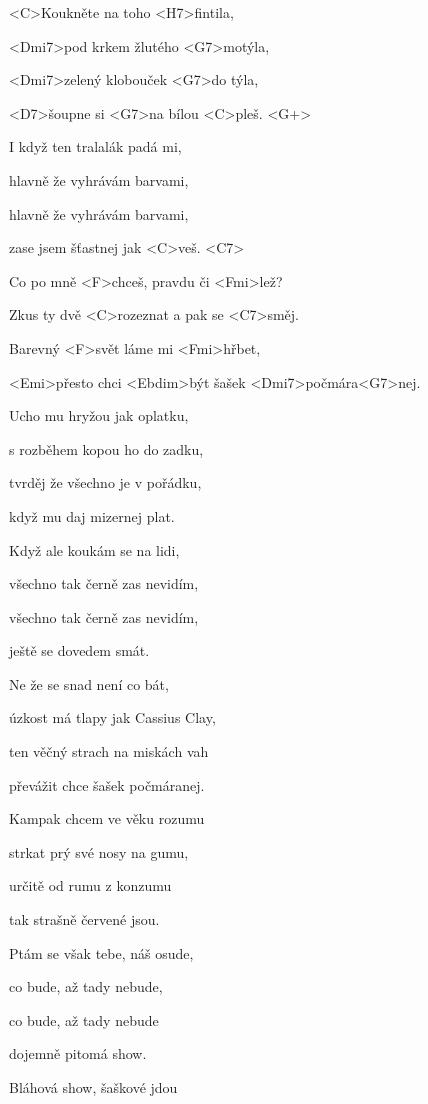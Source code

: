

\zs
<C>Koukněte na toho <H7>fintila,

<Dmi7>pod krkem žlutého <G7>motýla,

<Dmi7>zelený klobouček <G7>do týla,

<D7>šoupne si <G7>na bílou <C>pleš. <G+>
\ks

\zs
I když ten tralalák padá mi,

hlavně že vyhrávám barvami,

hlavně že vyhrávám barvami,

zase jsem šťastnej jak <C>veš. <C7>
\ks

\zr
Co po mně <F>chceš, pravdu či <Fmi>lež?

Zkus ty dvě <C>rozeznat a pak se <C7>směj.

Barevný <F>svět láme mi <Fmi>hřbet,

<Emi>přesto chci <Ebdim>být šašek <Dmi7>počmára<G7>nej.
\kr

\zs
Ucho mu hryžou jak oplatku,

s rozběhem kopou ho do zadku,

tvrděj že všechno je v pořádku,

když mu daj mizernej plat.
\ks

\zs
Když ale koukám se na lidi,

všechno tak černě zas nevidím,

všechno tak černě zas nevidím,

ještě se dovedem smát.
\ks

\zr
Ne že se snad není co bát,

úzkost má tlapy jak Cassius Clay,

ten věčný strach na miskách vah

převážit chce šašek počmáranej.
\kr

\zs
Kampak chcem ve věku rozumu

strkat prý své nosy na gumu,

určitě od rumu z konzumu

tak strašně červené jsou.
\ks

\zs
Ptám se však tebe, náš osude,

co bude, až tady nebude,

co bude, až tady nebude

dojemně pitomá show.
\ks

\zr
Bláhová show, šaškové jdou

